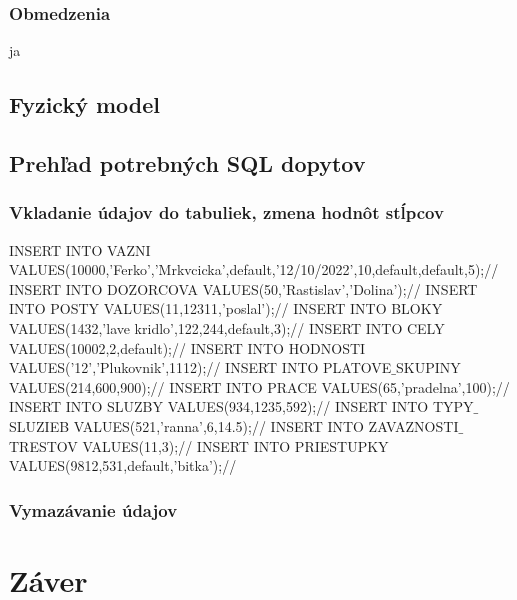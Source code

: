 \documentclass[slovak, 12pt, Times New Roman]{article}
\begin{document}
			\subsubsection{Obmedzenia}
				ja
		\subsection{Fyzický model}
		\subsection{Prehľad potrebných SQL dopytov}
			\subsubsection{Vkladanie údajov do tabuliek, zmena hodnôt stĺpcov}
				INSERT INTO VAZNI VALUES(10000,'Ferko','Mrkvcicka',default,'12/10/2022',10,default,default,5);//
				INSERT INTO DOZORCOVA VALUES(50,'Rastislav','Dolina');//
				INSERT INTO POSTY VALUES(11,12311,'poslal');//
				INSERT INTO BLOKY VALUES(1432,'lave kridlo',122,244,default,3);//
				INSERT INTO CELY VALUES(10002,2,default);//
				INSERT INTO HODNOSTI VALUES('12','Plukovnik',1112);//
				INSERT INTO PLATOVE$\_$SKUPINY VALUES(214,600,900);//
				INSERT INTO PRACE VALUES(65,'pradelna',100);//
				INSERT INTO SLUZBY VALUES(934,1235,592);//
				INSERT INTO TYPY$\_$SLUZIEB VALUES(521,'ranna',6,14.5);//
				INSERT INTO ZAVAZNOSTI$\_$TRESTOV VALUES(11,3);//
				INSERT INTO PRIESTUPKY VALUES(9812,531,default,'bitka');//
			\subsubsection{Vymazávanie údajov}
	\section{Záver}
\end{document}
